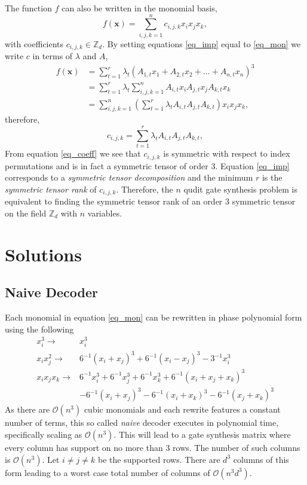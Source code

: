 \documentclass[11pt,a4paper]{article}
\begin{document}
	The function $f$ can also be written in the monomial basis,
	\begin{equation}
	\label{eq_mon}
	f(\mathbf{x}) = \sum_{i,j,k=1}^{n}c_{i,j,k}x_ix_jx_k,
	\end{equation}
	with coefficients $c_{i,j,k} \in \mathbb{Z}_d$. By setting equations \eqref{eq_imp} equal to \eqref{eq_mon} we write $c$ in terms of $\lambda$ and $A$,
	\begin{align}
	f(\mathbf{x}) &= \sum_{t=1}^r \lambda_t (A_{1,t}x_1 + A_{2,t}x_2 + \dots + A_{n,t}x_n)^3\\
	&= \sum_{t=1}^r \lambda_t \sum_{i,j,k=1}^n A_{i,t}x_i A_{j,t}x_j A_{k,t}x_k \\
	&= \sum_{i,j,k=1}^n \left( \sum_{t=1}^r \lambda_t  A_{i,t} A_{j,t} A_{k,t} \right) x_ix_jx_k,
	\end{align}
	therefore,
	\begin{equation}
	\label{eq_coeff}
	c_{i,j,k} = \sum_{t=1}^r \lambda_t  A_{i,t} A_{j,t} A_{k,t},
	\end{equation}
	From equation \eqref{eq_coeff} we see that $c_{i,j,k}$ is symmetric with respect to index permutations and is in fact a symmetric tensor of order 3. Equation \eqref{eq_imp} corresponds to a \emph{symmetric tensor decomposition} and the minimum $r$ is the \emph{symmetric tensor rank} of $c_{i,j,k}$. Therefore, the $n$ qudit gate synthesis problem is equivalent to finding the symmetric tensor rank of an order 3 symmetric tensor on the field $\mathbb{Z}_d$ with $n$ variables.
	
	\section{Solutions}
	\subsection{Naive Decoder}
	Each monomial in equation \eqref{eq_mon} can be rewritten in phase polynomial form using the following	
	\begin{equation}
	\begin{split}
	x_i^3 \rightarrow &x_i^3 \\
	x_ix_j^2 \rightarrow &6^{-1}(x_i + x_j)^3 + 6^{-1}(x_i - x_j)^3 - 3^{-1}x_i^3\\
	x_ix_jx_k \rightarrow &6^{-1}x_i^3 + 6^{-1}x_j^3 + 6^{-1}x_k^3 + 6^{-1}(x_i + x_j + x_k)^3
	\\ &- 6^{-1}(x_i + x_j)^3  - 6^{-1}(x_i + x_k)^3  - 6^{-1}(x_j + x_k)^3 
	\end{split}
	\end{equation}
	As there are $\mathcal{O}(n^3)$ cubic monomials and each rewrite features a constant number of terms, this so called \emph{naive} decoder executes in polynomial time, specifically scaling as $\mathcal{O}(n^3)$. This will lead to a gate synthesis matrix where every column has support on no more than 3 rows. The number of such columns is $\mathcal{O}(n^3)$. Let $i\neq j \neq k$ be the supported rows. There are $d^3$ columns of this form leading to a worst case total number of columns of $\mathcal{O}(n^3d^3)$.
	
\end{document}
